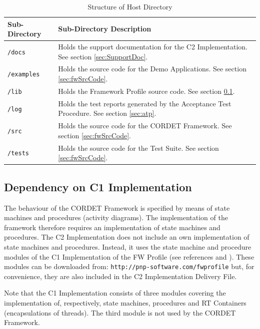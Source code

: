 \documentclass[a4paper,10pt]{article}
\begin{document}
\begin{longtable}{|l|p{7cm}|}
\caption{Structure of Host Directory}\label{tab:HostDir} \\
\hline
\rowcolor{light-gray}
\textbf{Sub-Directory} & \textbf{Sub-Directory Description}\\
\hline\hline
\texttt{/docs} & Holds the support documentation for the C2 Implementation. See section \ref{sec:SupportDoc}.\\
\hline
\texttt{/examples} & Holds the source code for the Demo Applications. See section \ref{sec:fwSrcCode}.\\
\hline
\texttt{/lib} & Holds the Framework Profile source code. See section \ref{sec:depC1}.\\
\hline
\texttt{/log} & Holds the test reports generated by the Acceptance Test Procedure. See section \ref{sec:atp}.\\
\hline
\texttt{/src} & Holds the source code for the CORDET Framework. See section \ref{sec:fwSrcCode}.\\
\hline
\texttt{/tests} & Holds the source code for the Test Suite. See section \ref{sec:fwSrcCode}.\\
\hline
\end{longtable}

\subsection{Dependency on C1 Implementation}\label{sec:depC1}
The behaviour of the CORDET Framework is specified by means of state machines and procedures (activity diagrams). The implementation of the framework therefore requires an implementation of state machines and procedures. The C2 Implementation does not include an own implementation of state machines and procedures. Instead, it uses the state machine and procedure modules of the C1 Implementation of the FW Profile (see references \cite{ref:fwprofile} and \cite{ref:C1Implementation}). These modules can be downloaded from: \texttt{http://pnp-software.com/fwprofile} but, for convenience, they are also included in the C2 Implementation Delivery File.

Note that the C1 Implementation consists of three modules covering the implementation of, respectively, state machines, procedures and RT Containers (encapsulations of threads). The third module is not used by the CORDET Framework.

\end{document}
